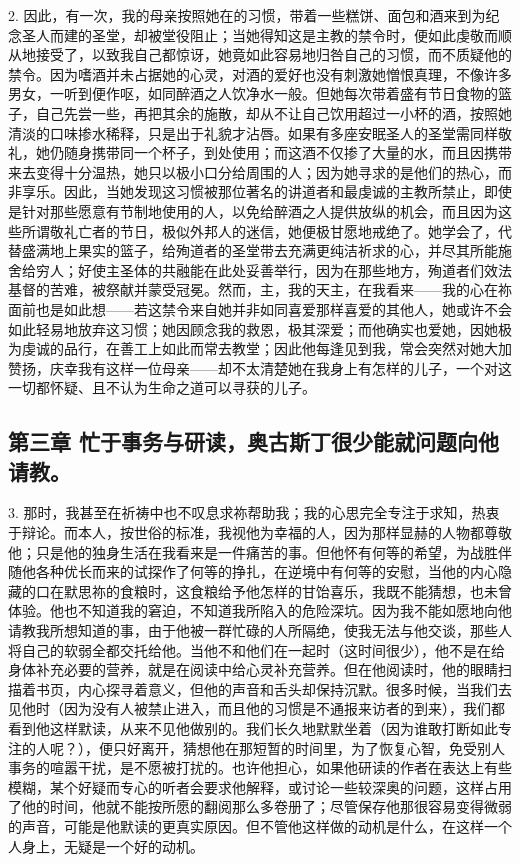 2. 因此，有一次，我的母亲按照她在的习惯，带着一些糕饼、面包和酒来到为纪念圣人而建的圣堂，却被堂役阻止；当她得知这是主教的禁令时，便如此虔敬而顺从地接受了，以致我自己都惊讶，她竟如此容易地归咎自己的习惯，而不质疑他的禁令。因为嗜酒并未占据她的心灵，对酒的爱好也没有刺激她憎恨真理，不像许多男女，一听到便作呕，如同醉酒之人饮净水一般。但她每次带着盛有节日食物的篮子，自己先尝一些，再把其余的施散，却从不让自己饮用超过一小杯的酒，按照她清淡的口味掺水稀释，只是出于礼貌才沾唇。如果有多座安眠圣人的圣堂需同样敬礼，她仍随身携带同一个杯子，到处使用；而这酒不仅掺了大量的水，而且因携带来去变得十分温热，她只以极小口分给周围的人；因为她寻求的是他们的热心，而非享乐。因此，当她发现这习惯被那位著名的讲道者和最虔诚的主教所禁止，即使是针对那些愿意有节制地使用的人，以免给醉酒之人提供放纵的机会，而且因为这些所谓敬礼亡者的节日，极似外邦人的迷信，她便极甘愿地戒绝了。她学会了，代替盛满地上果实的篮子，给殉道者的圣堂带去充满更纯洁祈求的心，并尽其所能施舍给穷人；好使主圣体的共融能在此处妥善举行，因为在那些地方，殉道者们效法基督的苦难，被祭献并蒙受冠冕。然而，主，我的天主，在我看来——我的心在祢面前也是如此想——若这禁令来自她并非如同喜爱那样喜爱的其他人，她或许不会如此轻易地放弃这习惯；她因顾念我的救恩，极其深爱；而他确实也爱她，因她极为虔诚的品行，在善工上如此而常去教堂；因此他每逢见到我，常会突然对她大加赞扬，庆幸我有这样一位母亲——却不太清楚她在我身上有怎样的儿子，一个对这一切都怀疑、且不认为生命之道可以寻获的儿子。\par


\subsection{第三章 忙于事务与研读，奥古斯丁很少能就问题向他请教。}

3. 那时，我甚至在祈祷中也不叹息求祢帮助我；我的心思完全专注于求知，热衷于辩论。而本人，按世俗的标准，我视他为幸福的人，因为那样显赫的人物都尊敬他；只是他的独身生活在我看来是一件痛苦的事。但他怀有何等的希望，为战胜伴随他各种优长而来的试探作了何等的挣扎，在逆境中有何等的安慰，当他的内心隐藏的口在默思祢的食粮时，这食粮给予他怎样的甘饴喜乐，我既不能猜想，也未曾体验。他也不知道我的窘迫，不知道我所陷入的危险深坑。因为我不能如愿地向他请教我所想知道的事，由于他被一群忙碌的人所隔绝，使我无法与他交谈，那些人将自己的软弱全都交托给他。当他不和他们在一起时（这时间很少），他不是在给身体补充必要的营养，就是在阅读中给心灵补充营养。但在他阅读时，他的眼睛扫描着书页，内心探寻着意义，但他的声音和舌头却保持沉默。很多时候，当我们去见他时（因为没有人被禁止进入，而且他的习惯是不通报来访者的到来），我们都看到他这样默读，从来不见他做别的。我们长久地默默坐着（因为谁敢打断如此专注的人呢？），便只好离开，猜想他在那短暂的时间里，为了恢复心智，免受别人事务的喧嚣干扰，是不愿被打扰的。也许他担心，如果他研读的作者在表达上有些模糊，某个好疑而专心的听者会要求他解释，或讨论一些较深奥的问题，这样占用了他的时间，他就不能按所愿的翻阅那么多卷册了；尽管保存他那很容易变得微弱的声音，可能是他默读的更真实原因。但不管他这样做的动机是什么，在这样一个人身上，无疑是一个好的动机。\par

